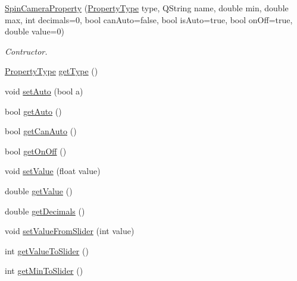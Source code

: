 \begin{DoxyCompactItemize}
\item 
\mbox{\hyperlink{class_camera_manager_spin_1_1_spin_camera_property_a46d9125c8eb6dce1ac771d5804790381}{Spin\+Camera\+Property}} (\mbox{\hyperlink{namespace_camera_manager_spin_ab89e54b93aaaec5c9a411f5b6aadde0c}{Property\+Type}} type, Q\+String name, double min, double max, int decimals=0, bool can\+Auto=false, bool is\+Auto=true, bool on\+Off=true, double value=0)
\begin{DoxyCompactList}\small\item\em Contructor. \end{DoxyCompactList}\item 
\mbox{\hyperlink{namespace_camera_manager_spin_ab89e54b93aaaec5c9a411f5b6aadde0c}{Property\+Type}} \mbox{\hyperlink{class_camera_manager_spin_1_1_spin_camera_property_ae83737f2fcade776b902e1275ebf0193}{get\+Type}} ()
\item 
void \mbox{\hyperlink{class_camera_manager_spin_1_1_spin_camera_property_a0d694945022e5a01f42cfb5f9180aba3}{set\+Auto}} (bool a)
\item 
bool \mbox{\hyperlink{class_camera_manager_spin_1_1_spin_camera_property_a985c2037105c514595ec67b5356b2a88}{get\+Auto}} ()
\item 
bool \mbox{\hyperlink{class_camera_manager_spin_1_1_spin_camera_property_ac9caec91860d8348124f7280eaee5190}{get\+Can\+Auto}} ()
\item 
bool \mbox{\hyperlink{class_camera_manager_spin_1_1_spin_camera_property_a30ae3678770e596ce81776e9ec5402bd}{get\+On\+Off}} ()
\item 
void \mbox{\hyperlink{class_camera_manager_spin_1_1_spin_camera_property_a020df5010ed0b2480f4dcd89985aa4ad}{set\+Value}} (float value)
\item 
double \mbox{\hyperlink{class_camera_manager_spin_1_1_spin_camera_property_a85ee3bf2a6937d74319407265aa46d55}{get\+Value}} ()
\item 
double \mbox{\hyperlink{class_camera_manager_spin_1_1_spin_camera_property_a01eedaa25704bb991f89eef585aa6ba5}{get\+Decimals}} ()
\item 
void \mbox{\hyperlink{class_camera_manager_spin_1_1_spin_camera_property_ae9db4d79cdfc7ecc2c44dcb9d4b4e796}{set\+Value\+From\+Slider}} (int value)
\item 
int \mbox{\hyperlink{class_camera_manager_spin_1_1_spin_camera_property_ac3596199ee0af23eb01cb3d2613932a3}{get\+Value\+To\+Slider}} ()
\item 
int \mbox{\hyperlink{class_camera_manager_spin_1_1_spin_camera_property_a3ec56e93dc2b15a87795a8985277f632}{get\+Min\+To\+Slider}} ()

\end{DoxyCompactItemize}
